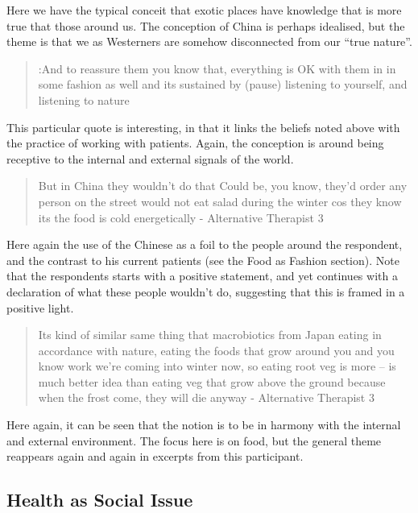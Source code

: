 Here we have the typical conceit that exotic places have knowledge that is more true that those around us. The conception of China is perhaps idealised, but the theme is that we as Westerners are somehow disconnected from our ``true nature''. 

\begin{quotation}
  :And to reassure them you know that, everything is OK with them in in some fashion as well and its sustained by (pause) listening to yourself, and listening to nature

\end{quotation}

This particular quote is interesting, in that it links the beliefs noted above with the practice of working with patients. Again, the conception is around being receptive to the internal and external signals of the world. 

\begin{quotation}
  But in China they wouldn't do that Could be, you know, they'd order any person on the street would not eat salad during the winter cos they know its the food is cold energetically - Alternative Therapist 3

\end{quotation}

Here again the use of the Chinese as a foil to the people around the respondent, and the contrast to his current patients (see the Food as Fashion section). Note that the respondents starts with a positive statement, and yet continues with a declaration of what these people wouldn't do, suggesting that this is framed in a positive light. 

\begin{quotation}
  Its kind of similar same thing that macrobiotics from Japan eating in accordance with nature, eating the foods that grow around you and you know work we're coming into winter now, so eating root veg is more – is much better idea than eating veg that grow above the ground because when the frost come, they will die anyway - Alternative Therapist 3

\end{quotation}

Here again, it can be seen that the notion is to be in harmony with the internal and external environment. The focus here is on food, but the general theme reappears again and again in excerpts from this participant. 

\subsection{Health as Social Issue}
\label{sec:health-as-social}


